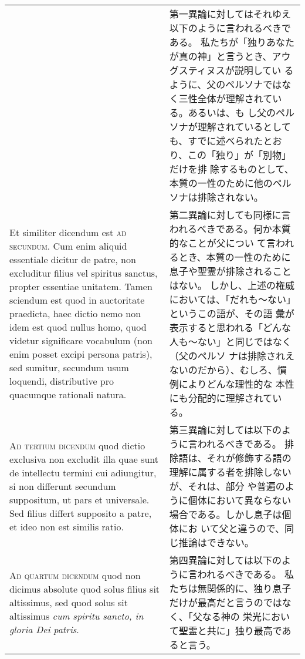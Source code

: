 \documentclass[10pt]{jsarticle} %
\begin{document}
\begin{longtable}{p{21em}p{21em}}
&

第一異論に対してはそれゆえ以下のように言われるべきである。
私たちが「独りあなたが真の神」と言うとき、アウグスティヌスが説明してい
 るように、父のペルソナではなく三性全体が理解されている。あるいは、も
 し父のペルソナが理解されているとしても、すでに述べられたとおり、この「独り」が「別物」だけを排
 除するものとして、本質の一性のために他のペルソナは排除されない。

\\



Et similiter dicendum est {\scshape ad secundum}. Cum enim aliquid essentiale
dicitur de patre, non excluditur filius vel spiritus sanctus, propter
essentiae unitatem. Tamen sciendum est quod in auctoritate praedicta,
haec dictio nemo non idem est quod nullus homo, quod videtur
significare vocabulum (non enim posset excipi persona patris), sed
sumitur, secundum usum loquendi, distributive pro quacumque rationali
natura.

&

第二異論に対しても同様に言われるべきである。何か本質的なことが父につい
 て言われるとき、本質の一性のために息子や聖霊が排除されることはない。
 しかし、上述の権威においては、「だれも〜ない」というこの語が、その語
 彙が表示すると思われる「どんな人も〜ない」と同じではなく（父のペルソ
 ナは排除されえないのだから）、むしろ、慣例によりどんな理性的な
 本性にも分配的に理解されている。

\\



{\scshape Ad tertium dicendum} quod dictio exclusiva non excludit illa quae sunt
de intellectu termini cui adiungitur, si non differunt secundum
suppositum, ut pars et universale. Sed filius differt supposito a
patre, et ideo non est similis ratio.

&

第三異論に対しては以下のように言われるべきである。
排除語は、それが修飾する語の理解に属する者を排除しないが、それは、部分
 や普遍のように個体において異ならない場合である。しかし息子は個体にお
 いて父と違うので、同じ推論はできない。

\\



{\scshape Ad quartum dicendum} quod non dicimus absolute quod solus filius sit
altissimus, sed quod solus sit altissimus {\itshape cum spiritu sancto, in
gloria Dei patris}.

&

第四異論に対しては以下のように言われるべきである。
私たちは無関係的に、独り息子だけが最高だと言うのではなく、「父なる神の
 栄光において聖霊と共に」独り最高であると言う。

\end{longtable}
\newpage
\end{document}
